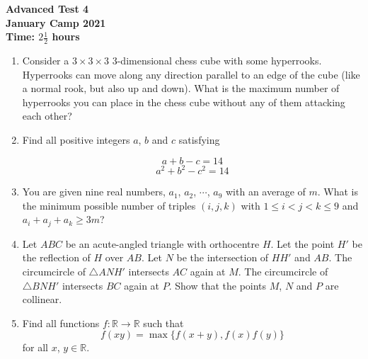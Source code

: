 \documentclass{article}
\begin{document}
\thispagestyle{empty}

\begin{center}
  \textbf{\Large Advanced Test 4}
  \\ \vspace{1em}
  \textbf{\large January Camp 2021}
  \\ \vspace{1em}
  \textbf{\large Time: $2\frac{1}{2}$ hours}
\end{center}

\vspace{12pt}

\begin{enumerate}[1.]

\item %
Consider a $3\times3\times3$ 3-dimensional chess cube with some hyperrooks.
Hyperrooks can move along any direction parallel to an edge of the cube (like a normal rook, but also up and down).
What is the maximum number of hyperrooks you can place in the chess cube without any of them attacking each other?


\item %
Find all positive integers $a$, $b$ and $c$ satisfying 

$$a + b - c = 14 $$
$$a^2 + b^2 - c^2 = 14$$


\item %
You are given nine real numbers, $a_1$, $a_2$, $\cdots$, $a_9$ with an average of $m$. What is the minimum possible number of triples $(i, j, k)$ with $1 \le i < j < k \le 9$ and $a_i + a_j + a_k \ge 3m$?


\item %
Let $ABC$ be an acute-angled triangle with orthocentre $H$. Let the point $H'$ be the reflection of $H$ over $AB$. Let $N$ be the intersection of $HH'$ and $AB$. The circumcircle of $\triangle ANH'$ intersects $AC$ again at $M$. The circumcircle of $\triangle BNH'$ intersects $BC$ again at $P$. Show that the points $M$, $N$ and $P$ are collinear.

\item %
Find all functions $f: \mathbb{R} \rightarrow \mathbb{R}$ such that 
$$f(xy) = \max\{f(x + y), f(x)f(y)\} $$
for all $x$, $y \in \mathbb{R}$.

\end{enumerate}
\end{document}
